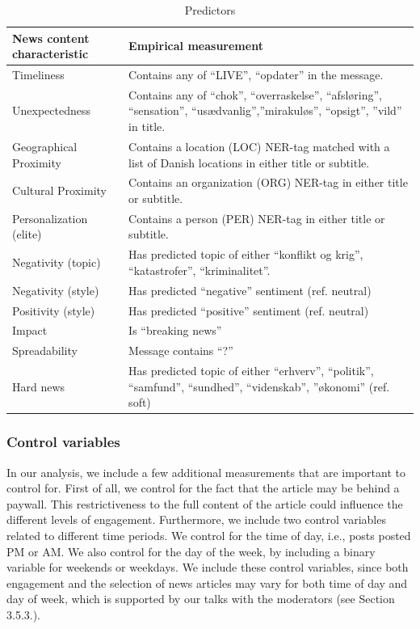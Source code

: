 \documentclass[
]{article}
\begin{document}
\begin{table}[H]

\caption{\label{tab:predictors_opera}Predictors}
\centering
\begin{tabular}[t]{l>{\raggedright\arraybackslash}p{8cm}}
\toprule
News content characteristic & Empirical measurement\\
\midrule
Timeliness & Contains any of “LIVE”, “opdater” in the message.\\
Unexpectedness & Contains any of “chok”, “overraskelse”, “afsløring”, “sensation”, “usædvanlig”,”mirakuløs”,  “opsigt”, ”vild” in title.\\
Geographical Proximity & Contains a location (LOC) NER-tag matched with a list of Danish locations in either title or subtitle.\\
Cultural Proximity & Contains an organization (ORG) NER-tag in either title or subtitle.\\
Personalization (elite) & Contains a person (PER) NER-tag in either title or subtitle.\\
Negativity (topic) & Has predicted topic of either “konflikt og krig”, “katastrofer”, “kriminalitet”.\\
Negativity (style) & Has predicted “negative” sentiment (ref. neutral)\\
Positivity (style) & Has predicted “positive” sentiment (ref. neutral)\\
Impact & Is “breaking news”\\
Spreadability & Message contains “?”\\
Hard news & Has predicted topic of either “erhverv”, “politik”, “samfund”, “sundhed”, “videnskab”, ”økonomi” (ref. soft)\\
\bottomrule
\end{tabular}
\end{table}

\hypertarget{control-variables}{%
\subsubsection{Control variables}\label{control-variables}}

\noindent In our analysis, we include a few additional measurements that
are important to control for. First of all, we control for the fact that
the article may be behind a paywall. This restrictiveness to the full
content of the article could influence the different levels of
engagement. Furthermore, we include two control variables related to
different time periods. We control for the time of day, i.e., posts
posted PM or AM. We also control for the day of the week, by including a
binary variable for weekends or weekdays. We include these control
variables, since both engagement and the selection of news articles may
vary for both time of day and day of week, which is supported by our
talks with the moderators (see Section 3.5.3.).
\end{document}
